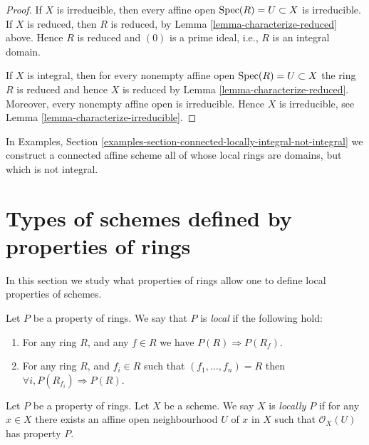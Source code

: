 \begin{proof}
If $X$ is irreducible, then every affine open $\mathop{\mathrm{Spec}}(R) = U \subset X$
is irreducible. If $X$ is reduced, then $R$ is reduced, by
Lemma \ref{lemma-characterize-reduced} above. Hence $R$ is reduced
and $(0)$ is a prime ideal, i.e., $R$ is an integral domain.

\medskip\noindent
If $X$ is integral, then for every nonempty affine open
$\mathop{\mathrm{Spec}}(R) = U \subset X$ the ring $R$ is reduced
and hence $X$ is reduced by Lemma \ref{lemma-characterize-reduced}.
Moreover, every nonempty affine open is irreducible.
Hence $X$ is irreducible, see Lemma \ref{lemma-characterize-irreducible}.
\end{proof}

\noindent
In Examples, Section
\ref{examples-section-connected-locally-integral-not-integral}
we construct a connected affine scheme all of whose local rings are domains,
but which is not integral.











\section{Types of schemes defined by properties of rings}
\label{section-properties-rings}

\noindent
In this section we study what properties of rings
allow one to define local properties of schemes.

\begin{definition}
\label{definition-property-local}
Let $P$ be a property of rings.
We say that $P$ is {\it local} if the following hold:
\begin{enumerate}
\item For any ring $R$, and any $f \in R$ we have
$P(R) \Rightarrow P(R_f)$.
\item For any ring $R$, and $f_i \in R$ such that
$(f_1, \ldots, f_n) = R$ then
$\forall i, P(R_{f_i}) \Rightarrow P(R)$.
\end{enumerate}
\end{definition}

\begin{definition}
\label{definition-locally-P}
Let $P$ be a property of rings. Let $X$ be a scheme.
We say $X$ is {\it locally $P$} if for any $x \in X$
there exists an affine open neighbourhood $U$ of $x$
in $X$ such that $\mathcal{O}_X(U)$ has property $P$.
\end{definition}

